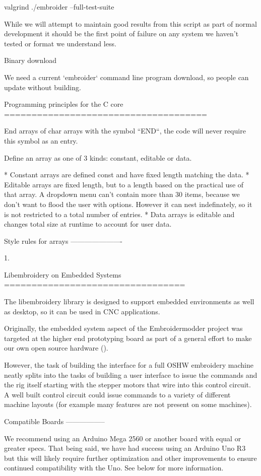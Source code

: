 \documentclass[a4paper]{report}
\begin{document}
{{{{{    valgrind ./embroider --full-test-suite

While we will attempt to maintain good results from this script as part of
normal development it should be the first point of failure on any system we
haven't tested or format we understand less.

Binary download
~~~~~~~~~~~~~~~

We need a current `embroider` command line program download, so people can update
without building.

Programming principles for the C core
=====================================

End arrays of char arrays with the symbol ``END``, the code will never require
this symbol as an entry.

Define an array as one of 3 kinds: constant, editable or data.

* Constant arrays are defined const and have fixed length matching the data.
* Editable arrays are fixed length, but to a length based on the practical use
  of that array. A dropdown menu can't contain more than 30 items, because we
  don't want to flood the user with options. However it can nest indefinately,
  so it is not restricted to a total number of entries.
* Data arrays is editable and changes total size at runtime to account for user data.

Style rules for arrays
----------------------

1.

Libembroidery on Embedded Systems
=================================

The libembroidery library is designed to support embedded environments as well
as desktop, so it can be used in CNC applications.

Originally, the embedded system aspect of the Embroidermodder project was
targeted at the higher end  prototyping board as part
of a general effort to make our own open source hardware ().

However, the task of building the interface for a full OSHW embroidery machine
neatly splits into the tasks of building a user interface to issue the
commands and the rig itself starting with the stepper motors that wire into
this control circuit. A well built control circuit could issue commands to
a variety of different machine layouts (for example many features are not
present on some machines).

Compatible Boards
-----------------

We recommend using an Arduino Mega 2560 or another board with equal or
greater specs. That being said, we have had success using an Arduino Uno
R3 but this will likely require further optimization and other
improvements to ensure continued compatibility with the Uno. See below
for more information.

}}}}}
\end{document}
